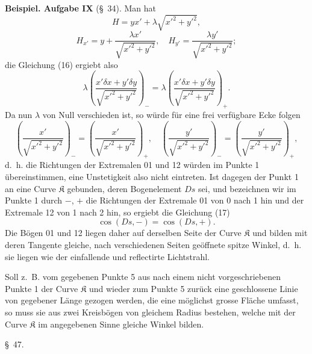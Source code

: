 \documentclass[11pt,a4paper,leqno]{article}
\begin{document}
\textbf{Beispiel. Aufgabe IX} (\S~34). Man hat
\[
H=yx' +\lambda\sqrt{x'^2+y'^2},
\]
\[
H_{x'}=y+\frac{\lambda x'}{\sqrt{x'^2+y'^2}},
\quad
H_{y'}=\frac{\lambda y'}{\sqrt{x'^2+y'^2}};
\]
die Gleichung (16) ergiebt also
\begin{equation}\tag{17}
\lambda\left(\frac{x'\delta x+y'\delta y}{\sqrt{x'^2+y'^2}}\right)_-
=
\lambda\left(\frac{x'\delta x+y'\delta y}{\sqrt{x'^2+y'^2}}\right)_+.
\end{equation}
Da nun $\lambda$ von Null verschieden ist, so würde für eine frei verfügbare Ecke folgen
\[
\left(\frac{x'}{\sqrt{x'^2+y'^2}}\right)_-
=
\left(\frac{x'}{\sqrt{x'^2+y'^2}}\right)_+,
\quad
\left(\frac{y'}{\sqrt{x'^2+y'^2}}\right)_-
=
\left(\frac{y'}{\sqrt{x'^2+y'^2}}\right)_+,
\]
 d.~h. die Richtungen der Extremalen 01 und 12 würden im Punkte 1 übereinstimmen, eine Unstetigkeit also nicht eintreten. Ist dagegen der Punkt 1 an eine Curve $\mathfrak K$ gebunden, deren Bogenelement $Ds$ sei, und bezeichnen wir im Punkte 1 durch $-$, $+$ die Richtungen der Extremale 01 von 0 nach 1 hin und der Extremale 12 von 1 nach 2 hin, so ergiebt die Gleichung (17)
\[
\cos(Ds,-)=\cos(Ds,+).
\]
Die Bögen 01 und 12 liegen daher auf derselben Seite der Curve $\mathfrak K$ und bilden mit deren Tangente gleiche, nach verschiedenen Seiten geöffnete spitze Winkel, d.~h. sie liegen wie der einfallende und reflectirte Lichtstrahl.

Soll z.~B. vom gegebenen Punkte 5 aus nach einem nicht vorgeschriebenen Punkte 1 der Curve $\mathfrak K$ und wieder zum Punkte 5 zurück eine geschlossene Linie von gegebener Länge gezogen werden, die eine möglichst grosse Fläche umfasst, so muss sie aus zwei Kreisbögen von gleichem Radius bestehen, welche mit der Curve $\mathfrak K$ im angegebenen Sinne gleiche Winkel bilden.

\begin{center}
{\large \S~47.}
\end{center}
\end{document}
